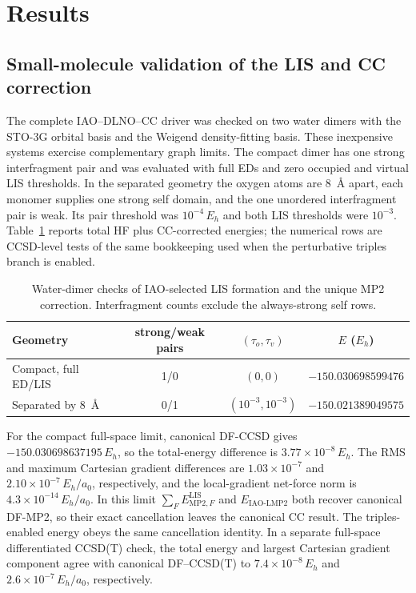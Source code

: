 \documentclass[11pt]{article}
\begin{document}
\section{Results}
\label{sec:results}

\subsection{Small-molecule validation of the LIS and CC correction}
\label{sec:small-cc-validation}

The complete IAO--DLNO--CC driver was checked on two water dimers with the
STO-3G orbital basis and the Weigend density-fitting basis.  These inexpensive
systems exercise complementary graph limits.  The compact dimer has one
strong interfragment pair and was evaluated with full EDs and zero occupied
and virtual LIS thresholds.  In the separated geometry the oxygen atoms are
$8$~\AA{} apart, each monomer supplies one strong self domain, and the one
unordered interfragment pair is weak.  Its pair threshold was
$10^{-4}\,E_h$ and both LIS thresholds were $10^{-3}$.  Table~\ref{tab:water-cc-validation}
reports total HF plus CC-corrected energies; the numerical rows are CCSD-level
tests of the same bookkeeping used when the perturbative triples branch is
enabled.

\begin{table}[htbp]
 \centering
 \caption{Water-dimer checks of IAO-selected LIS formation and the unique
 MP2 correction.  Interfragment counts exclude the always-strong self rows.}
 \label{tab:water-cc-validation}
 \begin{tabular}{@{}lccc@{}}
  \toprule
  Geometry & strong/weak pairs & $(\tau_o,\tau_v)$ & $E$ ($E_h$) \\
  \midrule
  Compact, full ED/LIS & 1/0 & $(0,0)$
    & $-150.030698599476$ \\
  Separated by $8$~\AA & 0/1 & $(10^{-3},10^{-3})$
    & $-150.021389049575$ \\
  \bottomrule
 \end{tabular}
\end{table}

For the compact full-space limit, canonical DF-CCSD gives
$-150.030698637195\,E_h$, so the total-energy difference is
$3.77\times10^{-8}\,E_h$.  The RMS and maximum Cartesian gradient differences
are $1.03\times10^{-7}$ and $2.10\times10^{-7}\,E_h/a_0$, respectively, and
the local-gradient net-force norm is $4.3\times10^{-14}\,E_h/a_0$.  In this
limit $\sum_F E_{\mathrm{MP2},F}^{\mathrm{LIS}}$ and
$E_{\mathrm{IAO\mbox{-}LMP2}}$ both recover canonical DF-MP2, so their exact
cancellation leaves the canonical CC result.  The triples-enabled energy obeys
the same cancellation identity.  In a separate full-space differentiated
CCSD(T) check, the total energy and largest Cartesian gradient component
agree with canonical DF--CCSD(T) to $7.4\times10^{-8}\,E_h$ and
$2.6\times10^{-7}\,E_h/a_0$, respectively.
\end{document}
